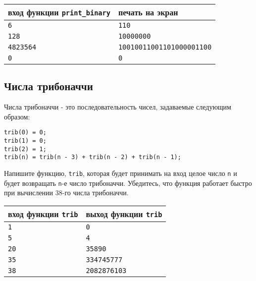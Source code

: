 \documentclass{article}
\begin{document}
\begin{center}
\begin{tabular}{ l | l }
 вход функции \texttt{print\_binary} & печать на экран \\ \hline
 \texttt{6} & \texttt{110}  \\
 \texttt{128} & \texttt{10000000}  \\  
 \texttt{4823564} & \texttt{10010011001101000001100}  \\
 \texttt{0} & \texttt{0}  \\
\end{tabular}
\end{center} 
 
 
\subsection{Числа трибоначчи}
Числа трибоначчи - это последовательность чисел, задаваемые следующим образом:
\begin{verbatim}
trib(0) = 0; 
trib(1) = 0; 
trib(2) = 1;
trib(n) = trib(n - 3) + trib(n - 2) + trib(n - 1);
\end{verbatim}
Напишите функцию, \texttt{trib}, которая будет принимать на вход целое число \texttt{n} и будет возвращать \texttt{n}-е число трибоначчи. Убедитесь, что функция работает быстро при вычислении 38-го числа трибоначчи.

\begin{center}
\begin{tabular}{ l | l }
 вход функции \texttt{trib} & выход функции \texttt{trib} \\ \hline
 \texttt{1} & \texttt{0}  \\
 \texttt{5} & \texttt{4}  \\
 \texttt{20} & \texttt{35890}  \\
 \texttt{35} & \texttt{334745777}  \\
 \texttt{38} & \texttt{2082876103}  \\
\end{tabular}
\end{center} 
 
 
\end{document}
